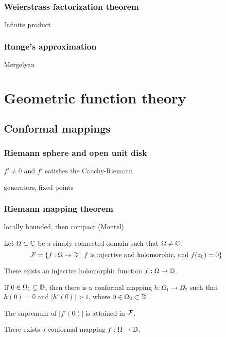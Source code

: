 \documentclass{../../large}
\begin{document}
\section{Weierstrass factorization theorem}
Infinite product

\section{Runge's approximation}
Mergelyan









\part{Geometric function theory}

\chapter{Conformal mappings}
\section{Riemann sphere and open unit disk}
\begin{prb}
$f'\ne0$ and $f'$ satisfies the Cauchy-Riemann
\end{prb}
\begin{prb}
generators,
fixed points
\end{prb}
\begin{prb}
\end{prb}

\section{Riemann mapping theorem}


\begin{prb}
locally bounded, then compact (Montel)
\end{prb}

\begin{prb}
\end{prb}

\begin{prb}
Let $\Omega\subset\mathbb{C}$ be a simply connected domain such that $\Omega\ne\mathbb{C}$.
\[\mathcal{F}=\{f:\Omega\to\mathbb{D}\mid f\text{ is injective and holomorphic, and }f(z_0)=0\}\]
\begin{parts}
\item There exists an injective holomorphic function $f:\Omega\to\mathbb{D}$.
\item If $0\in\Omega_1\subsetneq\mathbb{D}$, then there is a conformal mapping $h:\Omega_1\to\Omega_2$ such that $h(0)=0$ and $|h'(0)|>1$, where $0\in\Omega_2\subset\mathbb{D}$.
\item The supremum of $|f'(0)|$ is attained in $\mathcal{F}$.
\item There exists a conformal mapping $f:\Omega\to\mathbb{D}$.
\end{parts}
\end{prb}
\end{document}
